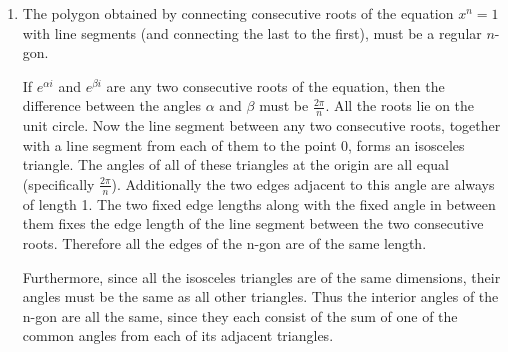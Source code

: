 \documentclass[fleqn]{article}
\newenvironment{answers}{ %
	\begin{enumerate}
		\setlength{\itemsep}{\bigskipamount}
}{\end{enumerate}}
\begin{document}
\begin{answers}
\begin{enumerate}
			\item
				For every even \(n\), there must be two real solutions to the equation \(x^n = 1\). This is because of the following which shows that both 1 and \(-1\) are real solutions the equation.
				\begin{equation*}
					\forall n \in \mathbb{N},\ (-1)^{2n} = 1^{2n} = 1
				\end{equation*}

			\item
				For every odd \(n\) there must be exactly one real solutions to the equation \(x^n = 1\). For any \(n\), \(x=1\) must be a solution, then adding \(\frac{2\pi}{n}\) radians about the unit circle gives another, and another until we arrive again at 1. Since \(n\) here is odd, \(\frac{2k\pi}{n}\) can never be equal to \(\pi\), else we would have \(n=2k\), contradicting its oddity. Thus none of the solutions are precisely \(\pi\) radians around the unit circle from 1, denying us the solution \(x=-1\) which is the only other real number on the unit circle.
		\end{enumerate}

	\item
		The polygon obtained by connecting consecutive roots of the equation \(x^n=1\) with line segments (and connecting the last to the first), must be a regular \(n\)-gon.

		If \(e^{\alpha i}\) and \(e^{\beta i}\) are any two consecutive roots of the equation, then the difference between the angles \(\alpha\) and \(\beta\) must be \(\frac{2\pi}{n}\). All the roots lie on the unit circle. Now the line segment between any two consecutive roots, together with a line segment from each of them to the point 0, forms an isosceles triangle. The angles of all of these triangles at the origin are all equal (specifically \(\frac{2\pi}{n}\)). Additionally the two edges adjacent to this angle are always of length 1. The two fixed edge lengths along with the fixed angle in between them fixes the edge length of the line segment between the two consecutive roots. Therefore all the edges of the n-gon are of the same length.

		Furthermore, since all the isosceles triangles are of the same dimensions, their angles must be the same as all other triangles. Thus the interior angles of the n-gon are all the same, since they each consist of the sum of one of the common angles from each of its adjacent triangles.
\end{answers}
\end{document}
